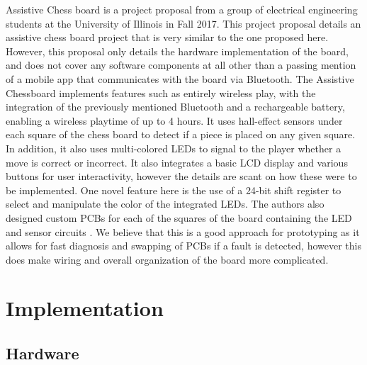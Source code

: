 \documentclass[11pt,journal]{IEEEtran}
\begin{document}
Assistive Chess board is a project proposal from a group of electrical engineering students at the University of Illinois in Fall 2017. This project proposal details an assistive chess board project that is very similar to the one proposed here. However, this proposal only details the hardware implementation of the board, and does not cover any software components at all other than a passing mention of a mobile app that communicates with the board via Bluetooth. The Assistive Chessboard implements features such as entirely wireless play, with the integration of the previously mentioned Bluetooth and a rechargeable battery, enabling a wireless playtime of up to 4 hours. It uses hall-effect sensors under each square of the chess board to detect if a piece is placed on any given square. In addition, it also uses multi-colored LEDs to signal to the player whether a move is correct or incorrect. It also integrates a basic LCD display and various buttons for user interactivity, however the details are scant on how these were to be implemented. One novel feature here is the use of a 24-bit shift register to select and manipulate the color of the integrated LEDs. The authors also designed custom PCBs for each of the squares of the board containing the LED and sensor circuits \cite{assistivechess}. We believe that this is a good approach for prototyping as it allows for fast diagnosis and swapping of PCBs if a fault is detected, however this does make wiring and overall organization of the board more complicated.




\section{Implementation}
\subsection{Hardware}
\end{document}
